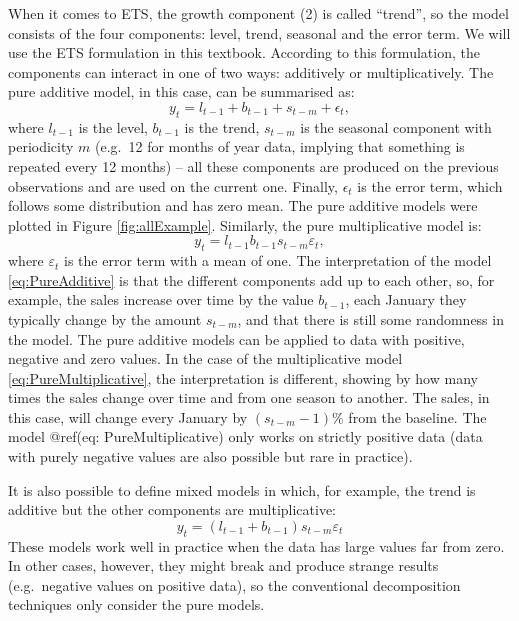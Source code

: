\documentclass[
]{book}
\theoremstyle{definition}
\theoremstyle{definition}
\theoremstyle{definition}
\theoremstyle{definition}
\theoremstyle{remark}
\begin{document}
When it comes to ETS, the growth component (2) is called ``trend'', so the model consists of the four components: level, trend, seasonal and the error term. We will use the ETS formulation in this textbook. According to this formulation, the components can interact in one of two ways: additively or multiplicatively. The pure additive model, in this case, can be summarised as:
\begin{equation}
    y_t = l_{t-1} + b_{t-1} + s_{t-m} + \epsilon_t ,
    \label{eq:PureAdditive}
\end{equation}
where \(l_{t-1}\) is the level, \(b_{t-1}\) is the trend, \(s_{t-m}\) is the seasonal component with periodicity \(m\) (e.g.~12 for months of year data, implying that something is repeated every 12 months) -- all these components are produced on the previous observations and are used on the current one. Finally, \(\epsilon_t\) is the error term, which follows some distribution and has zero mean. The pure additive models were plotted in Figure \ref{fig:allExample}. Similarly, the pure multiplicative model is:
\begin{equation}
    y_t = l_{t-1} b_{t-1} s_{t-m} \varepsilon_t ,
    \label{eq:PureMultiplicative}
\end{equation}
where \(\varepsilon_t\) is the error term with a mean of one. The interpretation of the model \eqref{eq:PureAdditive} is that the different components add up to each other, so, for example, the sales increase over time by the value \(b_{t-1}\), each January they typically change by the amount \(s_{t-m}\), and that there is still some randomness in the model. The pure additive models can be applied to data with positive, negative and zero values. In the case of the multiplicative model \eqref{eq:PureMultiplicative}, the interpretation is different, showing by how many times the sales change over time and from one season to another. The sales, in this case, will change every January by \((s_{t-m}-1)\)\% from the baseline. The model @ref(eq: PureMultiplicative) only works on strictly positive data (data with purely negative values are also possible but rare in practice).

It is also possible to define mixed models in which, for example, the trend is additive but the other components are multiplicative:
\begin{equation}
    y_t = (l_{t-1} + b_{t-1}) s_{t-m} \varepsilon_t
    \label{eq:MixedAdditiveTrend}
\end{equation}
These models work well in practice when the data has large values far from zero. In other cases, however, they might break and produce strange results (e.g.~negative values on positive data), so the conventional decomposition techniques only consider the pure models.
\end{document}
